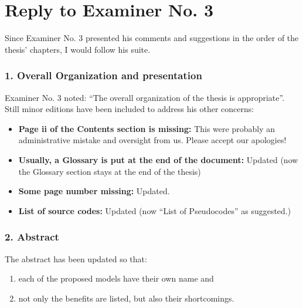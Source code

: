 \section*{Reply to Examiner No. 3}

\begin{replyheader}
\end{replyheader}  

Since Examiner No. 3 presented his comments and suggestions in the order of the thesis' chapters, 
  I would follow his suite.

\subsubsection*{1. Overall Organization and presentation}

Examiner No. 3 noted: ``The overall organization of the thesis is appropriate''.
Still minor editions have been included to address his  other concerns:


\begin{itemize}
  \item \textbf{Page ii of the Contents section is missing:} This were probably an administrative mistake and oversight from us. Please accept our apologies!
  \item \textbf{Usually, a Glossary is put at the end of the document: } Updated (now the Glossary section stays at the end of the thesis)
  \item \textbf{Some page number missing: } Updated. 
  \item \textbf{List of source codes: } Updated (now ``List of Pseudocodes'' as suggested.)
\end{itemize}

\subsubsection*{2. Abstract}

The abstract has been updated so that:

\begin{enumerate}
  \item each of the proposed models have their own name and
  \item not only the benefits are listed, but also their shortcomings.
\end{enumerate}

